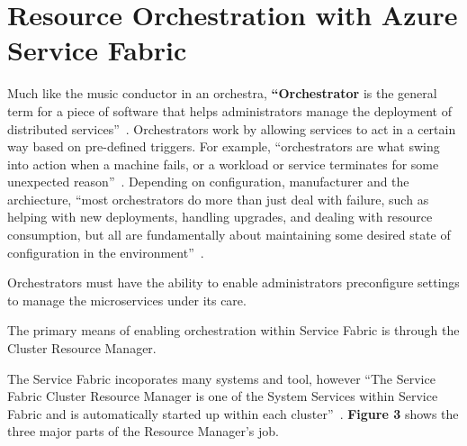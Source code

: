 \section{Resource Orchestration with Azure Service Fabric}
Much like the music conductor in an orchestra, {\bf ``Orchestrator} is the 
general term for a piece of software that
helps administrators manage the deployment of distributed
services''~\cite{hid-sp18-501-fig2and3}. Orchestrators work by allowing 
services to act in a certain
way based on pre-defined triggers. For example, 
``orchestrators are what
swing into action when a machine fails, or a workload or service
terminates for some unexpected reason''~\cite{hid-sp18-501-fig2and3}. 
Depending 
on configuration, manufacturer and the archiecture, ``most 
orchestrators do more than
just deal with failure, such as helping with new deployments, handling
upgrades, and dealing with resource consumption, but all are
fundamentally about maintaining some desired state of configuration in
the environment''~\cite{hid-sp18-501-fig2and3}.
 
Orchestrators must have the ability to enable administrators
preconfigure settings to manage the microservices
under its care.

The primary means of enabling orchestration within Service Fabric is
through the Cluster Resource Manager.

The Service Fabric incoporates many systems and tool, however
``The Service Fabric 
Cluster Resource Manager is one of the System
Services within Service Fabric and is automatically started up within
each cluster''~\cite{hid-sp18-501-fig2and3}.  
{\bf Figure 3} shows the three major parts of the Resource Manager's job.

